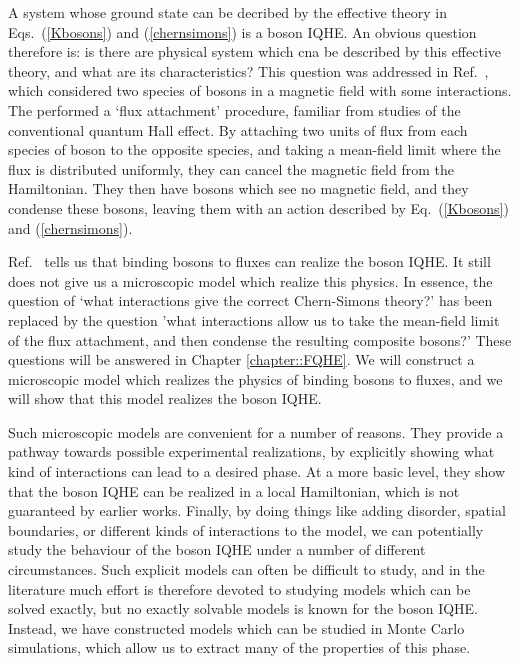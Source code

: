 A system whose ground state can be decribed by the effective theory in Eqs.~(\ref{Kbosons}) and (\ref{chernsimons}) is a boson IQHE. An obvious question therefore is: is there are physical system which cna be described by this effective theory, and what are its characteristics? This question was addressed in Ref.~\cite{SenthilLevin2012}, which considered two species of bosons in a magnetic field with some interactions. The performed a `flux attachment' procedure, familiar from studies of the conventional quantum Hall effect. By attaching two units of flux from each species of boson to the opposite species, and taking a mean-field limit where the flux is distributed uniformly, they can cancel the magnetic field from the Hamiltonian. They then have bosons which see no magnetic field, and they condense these bosons, leaving them with an action described by Eq.~(\ref{Kbosons}) and (\ref{chernsimons}). 

Ref.~\cite{SenthilLevin2012} tells us that binding bosons to fluxes can realize the boson IQHE. It still does not give us a microscopic model which realize this physics. In essence, the question of `what interactions give the correct Chern-Simons theory?' has been replaced by the question 'what interactions allow us to take the mean-field limit of the flux attachment, and then condense the resulting composite bosons?' These questions will be answered in Chapter \ref{chapter::FQHE}. We will construct a microscopic model which realizes the physics of binding bosons to fluxes, and we will show that this model realizes the boson IQHE.

Such microscopic models are convenient for a number of reasons. They provide a pathway towards possible experimental realizations, by explicitly showing what kind of interactions can lead to a desired phase. At a more basic level, they show that the boson IQHE can be realized in a local Hamiltonian, which is not guaranteed by earlier works. Finally, by doing things like adding disorder, spatial boundaries, or different kinds of interactions to the model, we can potentially study the behaviour of the boson IQHE under a number of different circumstances. 
Such explicit models can often be difficult to study, and in the literature much effort is therefore devoted to studying models which can be solved exactly, but no exactly solvable models is known for the boson IQHE. Instead, we have constructed models which can be studied in Monte Carlo simulations, which allow us to extract many of the properties of this phase.

